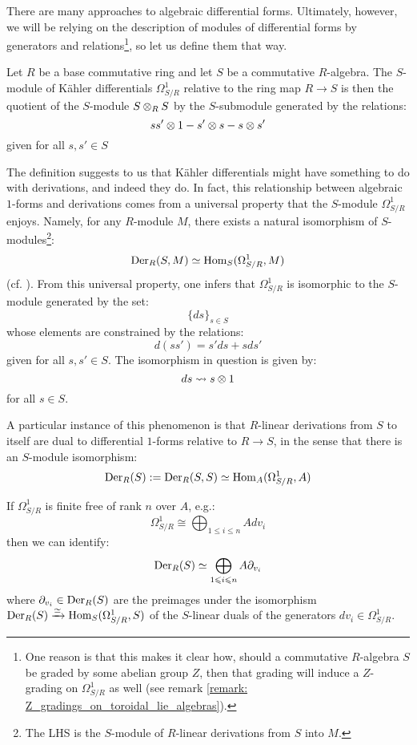         There are many approaches to algebraic differential forms. Ultimately, however, we will be relying on the description of modules of differential forms by generators and relations\footnote{One reason is that this makes it clear how, should a commutative $R$-algebra $S$ be graded by some abelian group $Z$, then that grading will induce a $Z$-grading on $\Omega^1_{S/R}$ as well (see remark \ref{remark: Z_gradings_on_toroidal_lie_algebras}).}, so let us define them that way.
        \begin{definition} \label{def: kahler_differentials}
            Let $R$ be a base commutative ring and let $S$ be a commutative $R$-algebra. The $S$-module of K\"ahler differentials $\Omega^1_{S/R}$ relative to the ring map $R \to S$ is then the quotient of the $S$-module $S \tensor_R S$ by the $S$-submodule generated by the relations:
                $$ss' \tensor 1 - s' \tensor s - s \tensor s'$$
            given for all $s, s' \in S$
        \end{definition}
        \begin{remark} \label{remark: differentials_and_derivations}
            The definition suggests to us that K\"ahler differentials might have something to do with derivations, and indeed they do. In fact, this relationship between algebraic $1$-forms and derivations comes from a universal property that the $S$-module $\Omega^1_{S/R}$ enjoys. Namely, for any $R$-module $M$, there exists a natural isomorphism of $S$-modules\footnote{The LHS is the $S$-module of $R$-linear derivations from $S$ into $M$.}:
                $$\mathrm{Der}_R(S, M) \simeq \mathrm{Hom}_S(\Omega^1_{S/R}, M)$$
            (cf. \cite[\href{https://stacks.math.columbia.edu/tag/00RO}{Tag 00RO}]{stacks}). From this universal property, one infers that $\Omega^1_{S/R}$ is isomorphic to the $S$-module generated by the set:
                $$\{ds\}_{s \in S}$$
            whose elements are constrained by the relations:
                $$d(ss') = s' ds + s ds'$$
            given for all $s, s' \in S$. The isomorphism in question is given by:
                $$ds \mapsto s \tensor 1$$
            for all $s \in S$.
            
            A particular instance of this phenomenon is that $R$-linear derivations from $S$ to itself are dual to differential $1$-forms relative to $R \to S$, in the sense that there is an $S$-module isomorphism:
                $$\mathrm{Der}_R(S) := \mathrm{Der}_R(S, S) \simeq \mathrm{Hom}_A(\Omega^1_{S/R}, A)$$
        \end{remark}
        \begin{remark} \label{remark: free_modules_of_1_forms}
            If $\Omega^1_{S/R}$ is finite free of rank $n$ over $A$, e.g.:
                $$\Omega^1_{S/R} \cong \bigoplus_{1 \leq i \leq n} A dv_i$$
            then we can identify:
                $$\mathrm{Der}_R(S) \simeq \bigoplus_{1 \leqslant i \leqslant n} A \partial_{v_i}$$
            where $\partial_{v_i} \in \mathrm{Der}_R(S)$ are the preimages under the isomorphism $\mathrm{Der}_R(S) \xrightarrow[]{\simeq} \mathrm{Hom}_S(\Omega^1_{S/R}, S)$ of the $S$-linear duals of the generators $dv_i \in \Omega^1_{S/R}$. 
        \end{remark}
        
